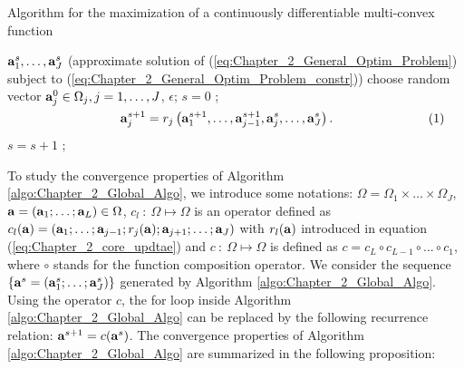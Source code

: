 \documentclass[
]{jss}
\begin{document}
\begin{algorithm}[!ht]
    \caption{Algorithm for the maximization of a continuously differentiable multi-convex function}
    \begin{algorithmic}[1]
         {$\mathbf{a}_1^s, \ldots, \mathbf{a}_J^s$ (approximate solution of (\ref{eq:Chapter_2_General_Optim_Problem}) subject to (\ref{eq:Chapter_2_General_Optim_Problem_constr}))}
         {choose random vector $\mathbf{a}_j^0\in\Omega_j, j =1, \ldots, J$, $\epsilon$;}
        \STATE$s = 0$ ;
        \REPEAT
        \STATE \hspace{-2cm}$\vcenter{\begin{equation}
            \ma a_j^{s+1} = r_j\left( \ma a_1^{s+1}, \ldots, \ma a_{j-1}^{s+1}, \ma a_j^{s}, \ldots, \ma a_J^{s}\right).
        \end{equation}}$
        \ENDFOR
        \STATE$s = s + 1$ ;
    \end{algorithmic}
    \label{algo:Chapter_2_Global_Algo}
\end{algorithm}

To study the convergence properties of Algorithm
\ref{algo:Chapter_2_Global_Algo}, we introduce some notations:
\(\Omega = \Omega_1 \times \ldots \times \Omega_J\),
\(\mathbf{a} = \left(\mathbf{a}_1; \ldots;\mathbf{a}_L\right) \in \Omega\),
\(c_l~:~\Omega\mapsto\Omega\) is an operator defined as
\(c_l(\mathbf{a}) = \left(\mathbf{a}_1; \ldots; \mathbf{a}_{j-1} ; r_j(\mathbf{a}) ; \mathbf{a}_{j+1} ; \ldots; \mathbf{a}_J\right)\)
with \(r_l(\mathbf{a})\) introduced in equation
(\ref{eq:Chapter_2_core_updtae}) and \(c~:~\Omega\mapsto\Omega\) is
defined as \(c = c_L\circ c_{L-1}\circ ... \circ c_1\), where \(\circ\)
stands for the function composition operator. We consider the sequence
\(\left\lbrace \mathbf{a}^s = \left(\mathbf{a}_1^{s}; \ldots; \mathbf{a}_J^{s} \right) \right\rbrace\)
generated by Algorithm \ref{algo:Chapter_2_Global_Algo}. Using the
operator \(c\), the \guillemotleft for loop\guillemotright{} inside
Algorithm \ref{algo:Chapter_2_Global_Algo} can be replaced by the
following recurrence relation: \(\mathbf{a}^{s+1} = c(\mathbf{a}^s)\). The
convergence properties of Algorithm \ref{algo:Chapter_2_Global_Algo} are
summarized in the following proposition:
\end{document}
